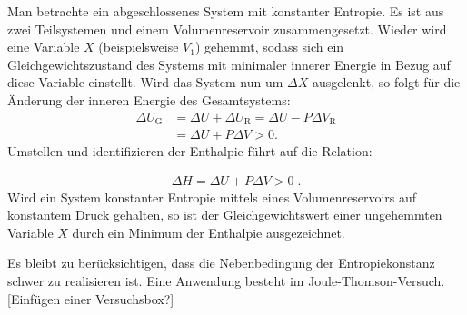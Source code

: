 Man betrachte ein abgeschlossenes System mit konstanter Entropie. Es ist aus zwei Teilsystemen und einem Volumenreservoir zusammengesetzt. Wieder wird eine Variable $X$ (beispielsweise $V_1$) gehemmt, sodass sich ein Gleichgewichtszustand des Systems mit minimaler innerer Energie in Bezug auf diese Variable einstellt. Wird das System nun um $\Delta X$ ausgelenkt, so folgt für die Änderung der inneren Energie des Gesamtsystems:
\begin{align*}
    \Delta U_\mathrm{G} &= \Delta U + \Delta U_\mathrm{R}= \Delta U - P\Delta V_\mathrm{R}\\
    &=\Delta U + P\Delta V>0.
\end{align*}
Umstellen und identifizieren der Enthalpie führt auf die Relation:
\begin{formal}
    \begin{align*}
        \boxed{\Delta H=\Delta U+P\Delta V>0}\;.
    \end{align*}
    Wird ein System konstanter Entropie mittels eines Volumenreservoirs auf konstantem Druck gehalten, so ist der Gleichgewichtswert einer ungehemmten Variable $X$ durch ein Minimum der Enthalpie ausgezeichnet.
\end{formal}
Es bleibt zu berücksichtigen, dass die Nebenbedingung der Entropiekonstanz schwer zu realisieren ist. Eine Anwendung besteht im Joule-Thomson-Versuch. [Einfügen einer Versuchsbox?]
